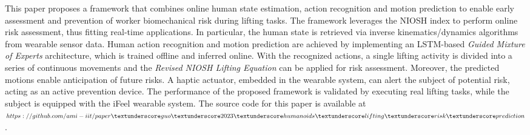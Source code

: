 This paper proposes a framework that combines online human state estimation, action recognition and motion prediction to enable early assessment and prevention of worker biomechanical risk during lifting tasks. The framework leverages the NIOSH index to perform online risk assessment, thus fitting real-time applications. In particular, the human state is retrieved via inverse kinematics/dynamics algorithms from wearable sensor data. Human action recognition and motion prediction are achieved by implementing an LSTM-based \emph{Guided Mixture of Experts} architecture, which is trained offline and inferred online. With the recognized actions, a single lifting activity is divided into a series of continuous movements and the \emph{Revised NIOSH Lifting Equation} can be applied for risk assessment. Moreover, the predicted motions enable anticipation of future risks. A haptic actuator, embedded in the wearable system, can alert the subject of potential risk, 
acting as an active prevention device. The performance of the proposed framework is validated by executing real lifting tasks, while the subject is equipped with the iFeel wearable system. The source code for this paper is available at \href{https://github.com/ami-iit/paper_guo_2023_humanoids_lifting_risk_prediction}{$https://github.com/ami-iit/paper \textunderscore guo \textunderscore 2023 \textunderscore humanoids \textunderscore lifting \textunderscore risk \textunderscore prediction$}.



